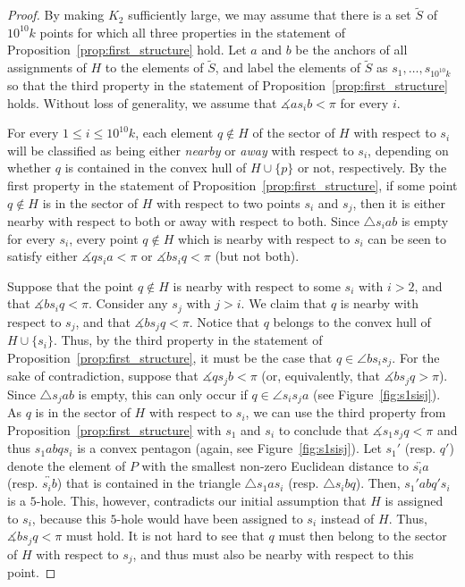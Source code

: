 \documentclass[10pt,a4paper]{amsart}
\begin{document}
\begin{proof} By making $K_2$ sufficiently large, we may assume that there is a set $\tilde{S}$ of $10^{10}k$ points for which all three properties in the statement of Proposition~\ref{prop:first_structure} hold. Let $a$ and $b$ be the anchors of all assignments of $H$ to the elements of $\tilde S$, and label the elements of $\tilde S$ as $s_1,\dots,s_{10^{10}k}$ so that the third property in the statement of Proposition~\ref{prop:first_structure} holds. Without loss of generality, we assume that $\measuredangle as_ib<\pi$ for every $i$. 

For every $1\leq i\leq 10^{10}k$, each element $q\not\in H$ of the sector of $H$ with respect to $s_i$ will be classified as being either \textit{nearby} or \textit{away} with respect to $s_i$, depending on whether $q$ is contained in the convex hull of $H\cup\{p\}$ or not, respectively. By the first property in the statement of Proposition~\ref{prop:first_structure}, if some point $q\notin H$ is in the sector of $H$ with respect to two points $s_i$ and $s_j$, then it is either nearby with respect to both or away with respect to both. Since $\triangle s_iab$ is empty for every $s_i$, every point $q\notin H$ which is nearby with respect to $s_i$ can be seen to satisfy either $\measuredangle qs_ia<\pi$ or $\measuredangle bs_iq<\pi$ (but not both).

Suppose that the point $q\notin H$ is nearby with respect to some $s_i$ with $i>2$, and that $\measuredangle bs_iq<\pi$. Consider any $s_j$ with $j>i$. We claim that $q$ is nearby with respect to $s_j$, and that $\measuredangle bs_jq<\pi$. Notice that $q$ belongs to the convex hull of $H\cup\{s_i\}$. Thus, by the third property in the statement of Proposition~\ref{prop:first_structure}, it must be the case that $q\in\angle bs_is_j$. For the sake of contradiction, suppose that $\measuredangle qs_jb<\pi$ (or, equivalently, that $\measuredangle bs_jq>\pi$). Since $\triangle s_jab$ is empty, this can only occur if $q\in\angle s_is_ja$ (see Figure~\ref{fig:s1sisj}). As $q$ is in the sector of $H$ with respect to $s_i$, we can use the third property from Proposition~\ref{prop:first_structure} with $s_1$ and $s_i$ to conclude that $\measuredangle s_1s_jq<\pi$ and thus $s_1abqs_i$ is a convex pentagon (again, see Figure~\ref{fig:s1sisj}). Let $s_1'$ (resp. $q'$) denote the element of $P$ with the smallest non-zero Euclidean distance to $\overleftrightarrow{s_ia}$ (resp. $\overleftrightarrow{s_ib}$) that is contained in the triangle $\triangle s_1as_i$ (resp. $\triangle s_ibq$). Then, $s_1'abq's_i$ is a $5$-hole. This, however, contradicts our initial assumption that $H$ is assigned to $s_i$, because this $5$-hole would have been assigned to $s_i$ instead of $H$. Thus, $\measuredangle bs_jq<\pi$ must hold. It is not hard to see that $q$ must then belong to the sector of $H$ with respect to $s_j$, and thus must also be nearby with respect to this point. 


\end{proof}
\end{document}
